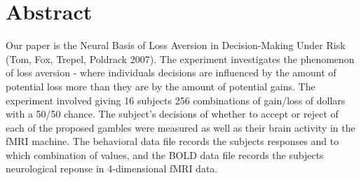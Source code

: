 \section{Abstract}
Our paper is the Neural Basis of Loss Aversion in Decision-Making Under Risk (Tom, Fox, Trepel, Poldrack 2007). The experiment investigates the phenomenon of loss aversion - where individuals decisions are influenced by the amount of potential loss more than they are by the amount of potential gains. The experiment involved giving 16 subjects 256 combinations of gain/loss of dollars with a 50/50 chance. The subject's decisions of whether to accept or reject of each of the proposed gambles were measured as well as their brain activity in the fMRI machine. The behavioral data file records the subjects responses and to which combination of values, and the BOLD data file records the subjects neurological reponse in 4-dimensional fMRI data. 


